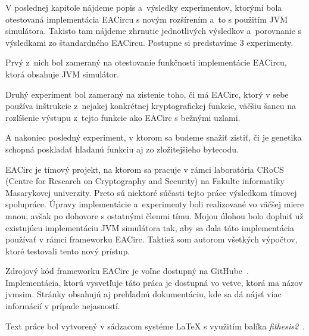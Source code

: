 V poslednej kapitole nájdeme popis a~výsledky experimentov, ktorými bola otestovaná implementácia EACircu s novým rozšírením a~to s použitím JVM simulátora. Takisto tam nájdeme zhrnutie jednotlivých výsledkov a~porovnanie s výsledkami zo štandardného EACircu. Postupne si predstavíme 3 experimenty.

\begin{myItemize}
	\item Prvý z~nich bol zameraný na otestovanie funkčnosti implementácie EACircu, ktorá obsahuje JVM simulátor.
	\item Druhý experiment bol zameraný na zistenie toho, či má EACirc, ktorý v sebe používa inštrukcie z~nejakej konkrétnej kryptografickej funkcie, väčšiu šancu na rozlíšenie výstupu z~tejto funkcie ako EACirc s bežnými uzlami.
	\item A nakoniec posledný experiment, v ktorom sa budeme snažiť zistiť, či je genetika schopná poskladať hľadanú funkciu aj zo zložitejšieho bytecodu.
\end{myItemize}

EACirc je tímový projekt, na ktorom sa pracuje v rámci laboratória CRoCS~\cite{crocs} (Centre for Research on Cryptography and Security) na Fakulte informatiky Masarykovej univerzity. Preto sú niektoré súčasti tejto práce výsledkom tímovej spolupráce. Úpravy implementácie a~experimenty boli realizované vo väčšej miere mnou, avšak po dohovore s ostatnými členmi tímu. Mojou úlohou bolo doplniť už existujúcu implementáciu JVM simulátora tak, aby sa dala táto implementácia používať v rámci frameworku EACirc. Taktiež som autorom všetkých výpočtov, ktoré testovali tento nový prístup.

Zdrojový kód frameworku EACirc je voľne dostupný na GitHube~\parencite{eacirc-github}. Implementácia, ktorú vysvetľuje táto práca je dostupná vo vetve, ktorá ma názov jvmsim. Stránky obsahujú aj prehľadnú dokumentáciu, kde sa dá nájsť viac informácií v prípade nejasností. 

Text práce bol vytvorený v sádzacom systéme \LaTeX{} s využitím balíka \textit{fithesis2}~\cite{fithesis2}.
